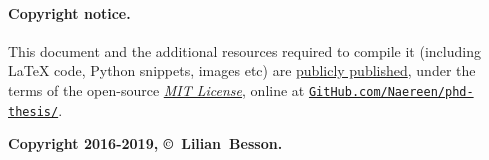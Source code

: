 



\vfill{}

\paragraph{Copyright notice.}
%
This document and the additional resources required to compile it (including \LaTeX{} code, Python snippets, images etc)
are \href{https://github.com/Naereen/phd-thesis/}{publicly published},
under the terms of the open-source \href{https://lbesson.mit-license.org/}{\emph{MIT License}},
online at \href{https://github.com/Naereen/phd-thesis/}{\texttt{GitHub.com/Naereen/phd-thesis/}}.


\begin{center}
    \textbf{Copyright 2016-2019, \copyright ~Lilian~Besson.}
\end{center}
